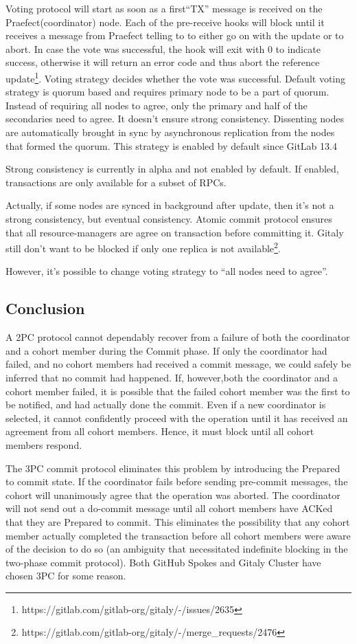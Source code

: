 \documentclass[sigplan, screen, nonacm, 11pt]{acmart}
\begin{document}
Voting protocol will start as soon as a first``TX'' message is received on the Praefect(coordinator) node.
Each of the pre-receive hooks will block until it receives a message from Praefect telling to to either go on with the update or to abort.
In case the vote was successful, the hook will exit with 0 to indicate success, otherwise it will return an error code and thus abort the reference update\footnote{https://gitlab.com/gitlab-org/gitaly/-/issues/2635}.
Voting strategy decides whether the vote was successful.
Default voting strategy is quorum based and requires primary node to be a part of quorum.
Instead of requiring all nodes to agree, only the primary and half of the secondaries need to agree.
It doesn't ensure strong consistency.
Dissenting nodes are automatically brought in sync by asynchronous replication from the nodes that formed the quorum.
This strategy is enabled by default since GitLab 13.4

Strong consistency is currently in alpha and not enabled by default.
If enabled, transactions are only available for a subset of RPCs.

Actually, if some nodes are synced in background after update, then it's not a strong consistency, but eventual consistency.
Atomic commit protocol ensures that all resource-managers are agree on transaction before committing it.
Gitaly still don't want to be blocked if only one replica is not available\footnote{https://gitlab.com/gitlab-org/gitaly/-/merge\_requests/2476}.

However, it's possible to change voting strategy to ``all nodes need to agree''.

\subsection{Conclusion}

A 2PC protocol cannot dependably recover from a failure of both the coordinator and a cohort member during the Commit phase.
If only the coordinator had failed, and no cohort members had received a commit message, we could safely be inferred
that no commit had happened.
If, however,both the coordinator and a cohort member failed, it is possible that the failed cohort member was the first
to be notified, and had actually done the commit.
Even if a new coordinator is selected, it cannot confidently proceed with the operation until it has received
an agreement from all cohort members. Hence, it must block until all cohort members respond.

The 3PC commit protocol eliminates this problem by introducing the Prepared to commit state.
If the coordinator fails before sending pre-commit messages, the cohort will unanimously agree that the operation was aborted.
The coordinator will not send out a do-commit message until all cohort members have ACKed that they are Prepared to commit.
This eliminates the possibility that any cohort member actually completed the transaction before all cohort
members were aware of the decision to do so (an ambiguity that necessitated indefinite blocking
in the two-phase commit protocol). Both GitHub Spokes and Gitaly Cluster have chosen 3PC for some reason.
\end{document}
